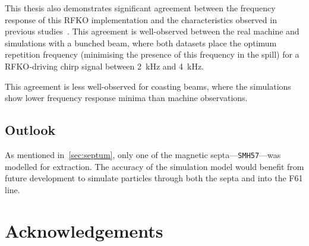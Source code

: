 \documentclass[11pt]{report}
\begin{document}
This thesis also demonstrates significant agreement between the frequency response of this RFKO implementation and the characteristics observed in previous studies~\cite{wepmp008,Pari:2780495}. This agreement is well-observed between the real machine and simulations with a bunched beam, where both datasets place the optimum repetition frequency (minimising the presence of this frequency in the spill) for a RFKO-driving chirp signal between \qty{2}{\kilo\hertz} and \qty{4}{\kilo\hertz}. 

This agreement is less well-observed for coasting beams, where the simulations show lower frequency response minima than machine observations. 


\section{Outlook}

As mentioned in~\autoref{sec:septum}, only one of the magnetic septa---\verb|SMH57|---was modelled for extraction. The accuracy of the simulation model would benefit from future development to simulate particles through both the septa and into the F61 line. 


\chapter{Acknowledgements}

 
 
\end{document}
